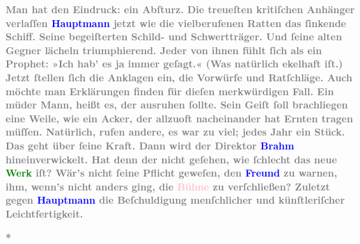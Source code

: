 \pstart
           \noindent{}\textcolor{gray}{\textbf{ Man hat den Eindruck: ein Abſturz. Die treueſten kritiſchen
                  Anhänger verlaſſen \textcolor{blue}{Hauptmann}{}\ledrightnote{\textcolor{blue}{Gerhart Hauptmann}} jetzt wie die
                  vielberufenen Ratten das ſinkende Schiff. Seine begeiſterten Schild- und
                  Schwertträger. Und ſeine alten Gegner lächeln triumphierend. Jeder von ihnen fühlt
                  ſich als ein Prophet: »Ich hab’ es ja immer geſagt.« (Was natürlich ekelhaft iſt.)
                  Jetzt ſtellen ſich die Anklagen ein, die Vorwürfe und Ratſchläge. Auch möchte man
                  Erklärungen finden für dieſen merkwürdigen Fall. Ein müder Mann, heißt es, der
                  ausruhen ſollte. Sein Geiſt ſoll brachliegen eine Weile, wie ein Acker, der
                  allzuoft nacheinander hat Ernten tragen müſſen. Natürlich, rufen andere, es war zu
                  viel; jedes Jahr ein Stück. Das geht über ſeine Kraft. Dann wird der Direktor \textcolor{blue}{Brahm}{}\ledrightnote{\textcolor{blue}{Otto Brahm}} hineinverwickelt. Hat denn der nicht
                  geſehen, wie ſchlecht das neue \textcolor{green}{Werk}{}\ledrightnote{{$\rightarrow$}\textcolor{green}{Die Jungfern vom Bischofsberg. Lustspiel}} iſt? Wär’s nicht ſeine Pflicht geweſen, den \textcolor{blue}{Freund}{}\ledrightnote{{$\rightarrow$}\textcolor{blue}{Gerhart Hauptmann}} zu warnen, ihm, wenn’s nicht
                  anders ging, die \textcolor{pink}{Bühne}{}\ledrightnote{{$\rightarrow$}\textcolor{pink}{Deutsches Theater Berlin}} zu
                  verſchließen? Zuletzt gegen \textcolor{blue}{Hauptmann}{}\ledrightnote{\textcolor{blue}{Gerhart Hauptmann}} die
                  Beſchuldigung menſchlicher und künſtleriſcher Leichtfertigkeit.}}\pend
           
\pstart
           \centering{}\textcolor{gray}{\textbf{*}}\pend
           
